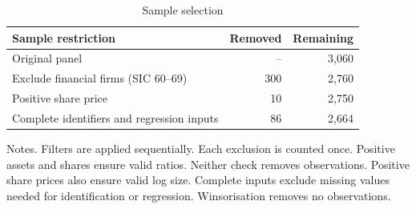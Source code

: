 \begin{table}[H]
  \centering
  \singlespacing
  \caption{Sample selection}
  \label{tab:sample_selection}
  \begin{tabular}{@{}lrr@{}}
    \toprule
    Sample restriction & Removed & Remaining \\
    \midrule
    Original panel & -- & 3,060 \\
    Exclude financial firms (SIC 60--69) & 300 & 2,760 \\
    Positive share price & 10 & 2,750 \\
    Complete identifiers and regression inputs & 86 & 2,664 \\
    \bottomrule
  \end{tabular}

  \medskip
  \begin{minipage}{\textwidth}
    Notes. Filters are applied sequentially. Each exclusion is counted once. Positive assets and shares ensure valid ratios. Neither check removes observations. Positive share prices also ensure valid log size. Complete inputs exclude missing values needed for identification or regression. Winsorisation removes no observations.
  \end{minipage}
\end{table}
